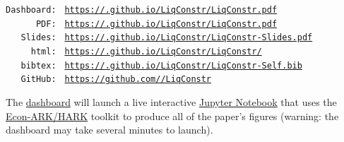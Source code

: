 \documentclass[titlepage,letterpaper]{\econtex}
\begin{document}
\vspace{-1cm}
\begin{authorsinfo}
\end{authorsinfo}

\hypertarget{links}{}
\medskip
\begin{small}
  \parbox{\textwidth}{
    \begin{center}
      \begin{tabbing}
        \texttt{Dashboard:~} \= \= \texttt{\href{https://econ-ark.org/materials/LiqConstr?dashboard}{https://\owner.github.io/LiqConstr/LiqConstr.pdf}} \\
        \texttt{~~~~~~PDF:~} \> \> \texttt{\href{https://\owner.github.io/LiqConstr/LiqConstr.pdf}{https://\owner.github.io/LiqConstr/LiqConstr.pdf}} \\
        \texttt{~~~Slides:~} \> \> \texttt{\href{https://\owner.github.io/LiqConstr/LiqConstr-Slides.pdf}{https://\owner.github.io/LiqConstr/LiqConstr-Slides.pdf}} \\
        \texttt{~~~~~html:~} \> \> \texttt{\href{https://\owner.github.io/LiqConstr/LiqConstr/}{https://\owner.github.io/LiqConstr/LiqConstr/}}    \\
        \texttt{~~~bibtex:~} \> \> \texttt{\href{https://\owner.github.io/LiqConstr/LiqConstr-Self.bib}{https://\owner.github.io/LiqConstr/LiqConstr-Self.bib}}  \\
        \texttt{~~~GitHub:~} \> \> \texttt{\href{https://github.com/\owner/LiqConstr}{https://github.com/\owner/LiqConstr}} \\
      \end{tabbing}
    \end{center}

    The \href{https://econ-ark.org/materials/LiqConstr?dashboard}{dashboard} will launch a live interactive \href{https://en.wikipedia.org/wiki/Project\_Jupyter\#Jupyter_Notebook}{Jupyter Notebook} that uses the \href{https://econ-ark/HARK}{Econ-ARK/HARK} toolkit to produce all of the paper's figures (warning: the dashboard may take several minutes to launch).
  } %
\end{small}
\end{document}
